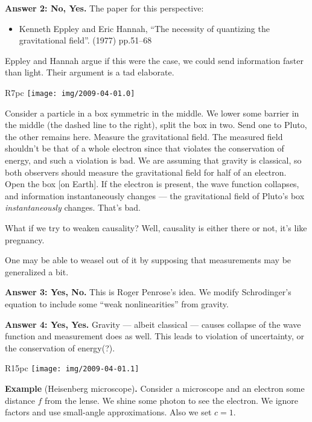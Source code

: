 \bigbreak\noindent\textbf{Answer 2: No, Yes.}
The paper for this perspective:

\begin{itemize}
\item Kenneth Eppley and Eric Hannah,
``The necessity of quantizing the gravitational field''.
  (1977) pp.51--68
\end{itemize}

Eppley and Hannah argue if this were the case, we could send information
faster than light. Their argument is a tad elaborate.

\begin{wrapfigure}{R}{7pc}
\centering
\texttt{[image: img/2009-04-01.0]}
\end{wrapfigure}

Consider a particle in a box symmetric in the middle. We lower some
barrier in the middle (the dashed line to the right), split the box in
two. Send one to Pluto, the other remains here. Measure the
gravitational field. The measured field shouldn't be that of a whole
electron since that violates the conservation of energy, and such a
violation is bad. We are assuming that gravity is classical, so both
observers should measure the gravitational field for half of an
electron. Open the box [on Earth]. If the electron is present, the wave
function collapses, and information instantaneously changes --- the
gravitational field of Pluto's box \emph{instantaneously}
changes. That's bad.

What if we try to weaken causality? Well, causality is either there or
not, it's like pregnancy.

One may be able to weasel out of it by supposing that measurements may
be generalized a bit.

\bigbreak\noindent\textbf{Answer 3: Yes, No.}  This is Roger Penrose's
idea. We modify Schrodinger's equation to include some ``weak
nonlinearities'' from gravity.

\bigbreak\noindent\textbf{Answer 4: Yes, Yes.}  Gravity --- albeit
classical --- causes collapse of the wave function and measurement does
as well. This leads to violation of uncertainty, or the conservation of
energy(?).


\begin{wrapfigure}{R}{15pc}\vskip-2pc
\centering
\texttt{[image: img/2009-04-01.1]}
\end{wrapfigure}\bigbreak\noindent\textbf{Example} (Heisenberg microscope)\textbf{.}
Consider a microscope and an electron some distance $f$ from the
lense. We shine some photon to see the electron. We ignore factors and
use small-angle approximations. Also we set $c=1$.

